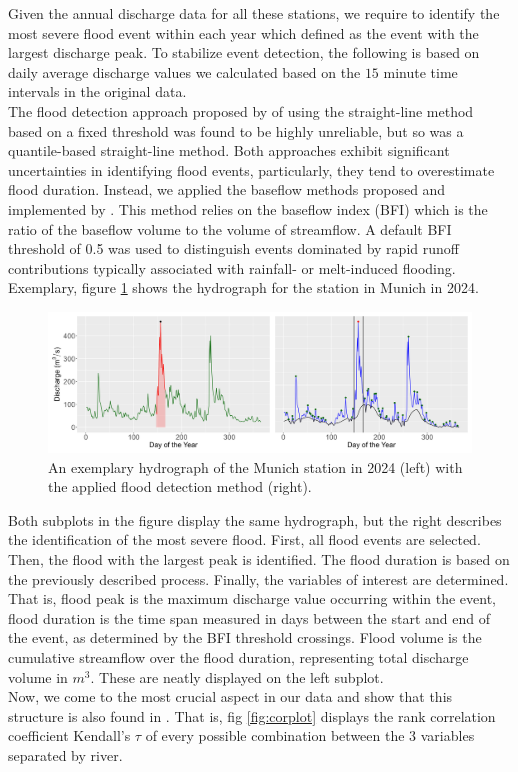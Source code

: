 \documentclass[
]{krantz}
\begin{document}
Given the annual discharge data for all these stations, we require to identify the
most severe flood event within each year which defined as the event with the largest discharge peak.
To stabilize event detection, the following is based on daily average discharge values we
calculated based on the \(15\) minute time intervals in the original data.\\
The flood detection approach proposed by \citet{grimaldi2006} of using the straight-line method based on a fixed threshold
was found to be highly unreliable, but so was a quantile-based straight-line method.
Both approaches exhibit significant uncertainties in identifying flood events,
particularly, they tend to overestimate flood duration.
Instead, we applied
the baseflow methods proposed and implemented by \citet{wasko2025}.
This method relies on the baseflow index (BFI) which is the ratio of the baseflow volume to the volume of streamflow.
A default BFI threshold of 0.5 was used to distinguish events dominated by rapid runoff contributions typically associated with rainfall- or melt-induced flooding.
Exemplary, figure \ref{fig:hydro} shows the hydrograph for the station in Munich in 2024.

\begin{figure}

{\centering \includegraphics[width=0.7\linewidth]{work/04-floodfreq/figures/data_hydrograph} 

}

\caption{An exemplary hydrograph of the Munich station in 2024 (left) with the applied flood detection method (right).}\label{fig:hydro}
\end{figure}

Both subplots in the figure display the same hydrograph, but the right describes the identification of the most
severe flood. First, all flood events are selected. Then, the flood with the largest peak is identified. The
flood duration is based on the previously described process.
Finally, the
variables of interest are determined. That is,
flood peak is the maximum discharge value occurring within the event,
flood duration is the time span measured in days between the start and end of the event, as determined by the BFI threshold crossings.
Flood volume is the cumulative streamflow over the flood duration, representing total discharge volume in \(m^3\).
These are neatly displayed on the left subplot.\\
Now, we come to the most crucial aspect in our data and show that this structure is also found in \citet{grimaldi2006}. That is, fig \ref{fig:corplot} displays the rank correlation coefficient Kendall's \(\tau\)
of every possible combination between the \(3\) variables separated by river.\\
\end{document}
